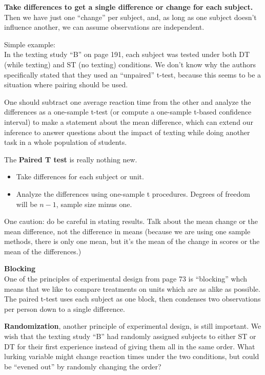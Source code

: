 {\bf Take differences to get a single difference or change for each
  subject.} Then we have just one ``change'' per subject, and, as long
as one subject doesn't influence another, we can assume observations
are independent.  


Simple example:\\
  In the texting study ``B'' on page 191, each subject was tested
  under both DT (while texting) and ST (no texting) conditions.  We
  don't know why the authors specifically stated that they used an
  ``unpaired'' t-test, because this seems to be a situation where
  pairing should be used.  

  One should subtract one average reaction time from the other and
  analyze the differences as a one-sample t-test (or compute a
  one-sample t-based confidence interval) to make a statement about
  the mean difference, which can extend our inference to answer
  questions about the impact of texting while doing another task in a
  whole population of students.\vspace{.4cm}

The {\bf Paired T test} is really nothing new. 
\begin{itemize}
\item Take differences for each subject or unit.
\item Analyze the differences using one-sample t procedures. Degrees
  of freedom will be $n-1$, sample size minus one.
\end{itemize}
One caution: do be careful in stating results. 
Talk about the mean change or the mean difference, not the difference
in means (because we are using one sample methods, there is only one
mean, but it's the mean of the change in scores or the mean of the differences.)


{\bf Blocking}\\
  One of the principles of experimental design from page 73 is
  ``blocking'' whch means that we like to compare treatments on units
  which are as alike as possible.  The paired t-test uses each subject
  as one block, then condenses two observations per person down to a
  single difference.
 
{\bf Randomization}, another principle of experimental design, is
still important.  We wish that the texting study ``B'' had randomly
assigned  subjects to either ST or DT for their first experience
 instead of giving them all in the same order.  What lurking
variable  might change reaction times under the two conditions, but
could be ``evened out'' by randomly changing the order?\vspace{1cm}

